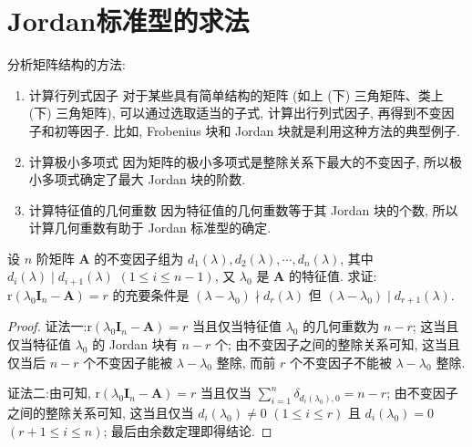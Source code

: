 \documentclass[../../main.tex]{subfiles}%
\begin{document}
\section{Jordan标准型的求法}\label{section:Jordan标准型的求法}

\hypertarget{分析矩阵结构的方法}{分析矩阵结构的方法:}
\begin{enumerate}[(1)]
\item 计算行列式因子 对于某些具有简单结构的矩阵 (如上 (下) 三角矩阵、类上 (下) 三角矩阵), 可以通过选取适当的子式, 计算出行列式因子, 再得到不变因子和初等因子. 比如, Frobenius 块和 Jordan 块就是利用这种方法的典型例子.

\item 计算极小多项式 因为矩阵的极小多项式是整除关系下最大的不变因子, 所以极小多项式确定了最大 Jordan 块的阶数.

\item 计算特征值的几何重数 因为特征值的几何重数等于其 Jordan 块的个数, 所以计算几何重数有助于 Jordan 标准型的确定. 
\end{enumerate}

\begin{proposition}\label{proposition:矩阵任一特征值对应的特征矩阵的秩为r的充要条件}
设 \(n\) 阶矩阵 \(\boldsymbol{A}\) 的不变因子组为 \(d_1(\lambda), d_2(\lambda), \cdots, d_n(\lambda)\), 其中 \(d_i(\lambda) \mid d_{i + 1}(\lambda)\) \((1 \leqslant  i \leqslant  n - 1)\), 又 \(\lambda_0\) 是 \(\boldsymbol{A}\) 的特征值. 求证: \(\mathrm{r}(\lambda_0\boldsymbol{I}_n - \boldsymbol{A}) = r\) 的充要条件是 \((\lambda - \lambda_0) \nmid d_r(\lambda)\) 但 \((\lambda - \lambda_0) \mid d_{r + 1}(\lambda)\).
\end{proposition}
\begin{proof}

{\color{blue}证法一:}\(\mathrm{r}(\lambda_0\boldsymbol{I}_n - \boldsymbol{A}) = r\) 当且仅当特征值 \(\lambda_0\) 的几何重数为 \(n - r\); 这当且仅当特征值 \(\lambda_0\) 的 Jordan 块有 \(n - r\) 个; 由不变因子之间的整除关系可知, 这当且仅当后 \(n - r\) 个不变因子能被 \(\lambda - \lambda_0\) 整除, 而前 \(r\) 个不变因子不能被 \(\lambda - \lambda_0\) 整除.

{\color{blue}证法二:}由可知, \(\mathrm{r}(\lambda_0\boldsymbol{I}_n - \boldsymbol{A}) = r\) 当且仅当 \(\sum_{i = 1}^{n} \delta_{d_i(\lambda_0),0} = n - r\); 由不变因子之间的整除关系可知, 这当且仅当 \(d_i(\lambda_0) \neq 0\) \((1 \leqslant  i \leqslant  r)\) 且 \(d_i(\lambda_0) = 0\) \((r + 1 \leqslant  i \leqslant  n)\); 最后由余数定理即得结论.

\end{proof}
\end{document}
